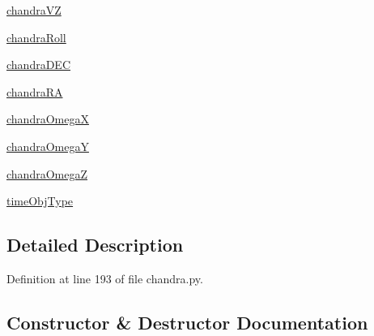 \begin{DoxyCompactItemize}
\item 
\hyperlink{classmodest_1_1spacecraft_1_1chandra_1_1ChandraDynamics_a716ee8b96a2e1346ae371426fe373a2d}{chandra\+VZ}
\item 
\hyperlink{classmodest_1_1spacecraft_1_1chandra_1_1ChandraDynamics_a59c8f88f8efb46c21dc9196d67ff2b1e}{chandra\+Roll}
\item 
\hyperlink{classmodest_1_1spacecraft_1_1chandra_1_1ChandraDynamics_a5482dfa924b463375b2275805d0adb5e}{chandra\+D\+EC}
\item 
\hyperlink{classmodest_1_1spacecraft_1_1chandra_1_1ChandraDynamics_a6d00225ae1c0689ba29e2acb5dd37b23}{chandra\+RA}
\item 
\hyperlink{classmodest_1_1spacecraft_1_1chandra_1_1ChandraDynamics_afbde5ed043208401d1391e2508470a55}{chandra\+OmegaX}
\item 
\hyperlink{classmodest_1_1spacecraft_1_1chandra_1_1ChandraDynamics_afa3400f2f4c4eece1e7f30b4b2417caa}{chandra\+OmegaY}
\item 
\hyperlink{classmodest_1_1spacecraft_1_1chandra_1_1ChandraDynamics_acafb15d9219d4132e86060714b665f1b}{chandra\+OmegaZ}
\item 
\hyperlink{classmodest_1_1spacecraft_1_1chandra_1_1ChandraDynamics_abe97d4114895e675fc0e5088235d8c9c}{time\+Obj\+Type}
\end{DoxyCompactItemize}


\subsection{Detailed Description}


Definition at line 193 of file chandra.\+py.



\subsection{Constructor \& Destructor Documentation}
